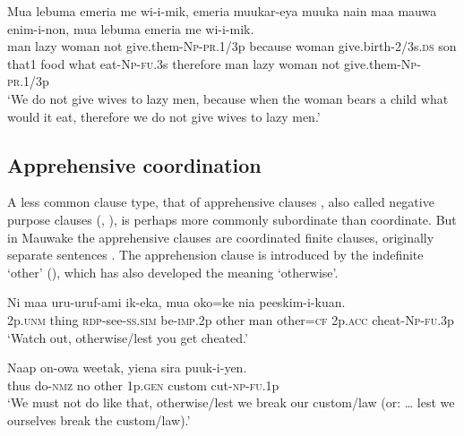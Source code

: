 \ea%
\label{ex:8:x1423}
\gll Mua  lebuma  emeria  me  wi-i-mik,    emeria  muukar-eya  muuka  nain  maa  mauwa  enim-i-non,   mua  lebuma  emeria  me  wi-i-mik.\\
man  lazy  woman  not  give.them-\textsc{Np}-\textsc{pr}.1/3p because  woman give.birth-2/3s.\textsc{ds} son  that1  food  what  eat-\textsc{Np}-\textsc{fu}.3s therefore  man  lazy  woman  not  give.them-\textsc{Np}-\textsc{pr}.1/3p\\
\glt`We do not give wives to lazy men, because when the woman bears a child what would it eat, therefore we do not give wives to lazy men.'
\z


\subsection{Apprehensive coordination} \label{sec:8.1.6}

A less common clause type, that of apprehensive clauses \citep[61]{Roberts1987}, also called negative purpose clauses (\citealt[444]{Haiman1980}, \citealt[188]{ThompsonEtAl1985}), is perhaps more commonly subordinate than coordinate. But in Mauwake the apprehensive clauses are coordinated finite clauses, originally separate sentences . The apprehension clause is introduced by the indefinite  `other' (), which has also developed the meaning `otherwise'.  

\ea%
\label{ex:8:x1426}
\gll Ni  maa  uru-uruf-ami  ik-eka,    mua  oko=ke nia  peeskim-i-kuan.\\
2p.\textsc{unm} thing \textsc{rdp}-see-\textsc{ss}.\textsc{sim}  be-\textsc{imp}.2p  other  man  other=\textsc{cf} 2p.\textsc{acc}  cheat-\textsc{Np}-\textsc{fu}.3p\\
\glt`Watch out, otherwise/lest you get cheated.'
\z


\ea%
\label{ex:8:x1427}
\gll Naap  on-owa  weetak,   yiena  sira  puuk-i-yen. \\
thus  do-\textsc{nmz} no other 1p.\textsc{gen} custom  cut-\textsc{np}-\textsc{fu}.1p\\
\glt`We must not do like that, otherwise/lest we break our custom/law (or: {\dots} lest we ourselves break the custom/law).'
\z


